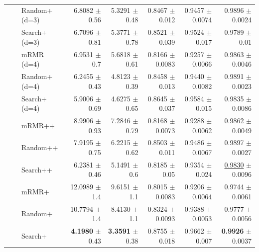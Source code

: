\begin{longtable}{llp{}rrrrr}
 &  & Random+ (d=3) & 6.8082 {\scriptsize $\pm$ 0.56} & 5.3291 {\scriptsize $\pm$ 0.48} & 0.8467 {\scriptsize $\pm$ 0.012} & 0.9457 {\scriptsize $\pm$ 0.0074} & 0.9896 {\scriptsize $\pm$ 0.0024} \\
 &  & Search+ (d=3) & 6.7096 {\scriptsize $\pm$ 0.81} & 5.3771 {\scriptsize $\pm$ 0.78} & 0.8521 {\scriptsize $\pm$ 0.039} & 0.9524 {\scriptsize $\pm$ 0.017} & 0.9789 {\scriptsize $\pm$ 0.01} \\
 &  & mRMR (d=4) & 6.9531 {\scriptsize $\pm$ 0.7} & 5.6818 {\scriptsize $\pm$ 0.61} & 0.8166 {\scriptsize $\pm$ 0.0083} & 0.9257 {\scriptsize $\pm$ 0.0066} & 0.9863 {\scriptsize $\pm$ 0.0046} \\
 &  & Random+ (d=4) & 6.2455 {\scriptsize $\pm$ 0.43} & 4.8123 {\scriptsize $\pm$ 0.39} & 0.8458 {\scriptsize $\pm$ 0.013} & 0.9440 {\scriptsize $\pm$ 0.0082} & 0.9891 {\scriptsize $\pm$ 0.0023} \\
 &  & Search+ (d=4) & 5.9006 {\scriptsize $\pm$ 0.69} & 4.6275 {\scriptsize $\pm$ 0.65} & 0.8645 {\scriptsize $\pm$ 0.037} & 0.9584 {\scriptsize $\pm$ 0.015} & 0.9835 {\scriptsize $\pm$ 0.0086} \\
 &  & mRMR++ & 8.9906 {\scriptsize $\pm$ 0.93} & 7.2846 {\scriptsize $\pm$ 0.79} & 0.8168 {\scriptsize $\pm$ 0.0073} & 0.9288 {\scriptsize $\pm$ 0.0062} & 0.9862 {\scriptsize $\pm$ 0.0049} \\
 &  & Random++ & 7.9195 {\scriptsize $\pm$ 0.75} & 6.2215 {\scriptsize $\pm$ 0.62} & 0.8503 {\scriptsize $\pm$ 0.011} & 0.9486 {\scriptsize $\pm$ 0.0067} & 0.9897 {\scriptsize $\pm$ 0.0027} \\
 &  & Search++ & 6.2381 {\scriptsize $\pm$ 0.46} & 5.1491 {\scriptsize $\pm$ 0.6} & 0.8185 {\scriptsize $\pm$ 0.05} & 0.9354 {\scriptsize $\pm$ 0.024} & \underline{0.9830} {\scriptsize $\pm$ 0.0096} \\
 &  & mRMR+ & 12.0989 {\scriptsize $\pm$ 1.4} & 9.6151 {\scriptsize $\pm$ 1.1} & 0.8015 {\scriptsize $\pm$ 0.0083} & 0.9206 {\scriptsize $\pm$ 0.0064} & 0.9744 {\scriptsize $\pm$ 0.0061} \\
 &  & Random+ & 10.7794 {\scriptsize $\pm$ 1.4} & 8.4130 {\scriptsize $\pm$ 1.1} & 0.8324 {\scriptsize $\pm$ 0.0093} & 0.9388 {\scriptsize $\pm$ 0.0053} & 0.9777 {\scriptsize $\pm$ 0.0056} \\
 &  & Search+ & \textbf{4.1980} {\scriptsize $\pm$ 0.43} & \textbf{3.3591} {\scriptsize $\pm$ 0.38} & 0.8755 {\scriptsize $\pm$ 0.018} & 0.9662 {\scriptsize $\pm$ 0.007} & \textbf{0.9926} {\scriptsize $\pm$ 0.0037} \\

\end{longtable}
